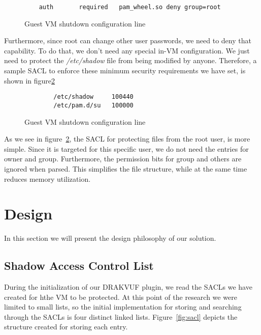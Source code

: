 \begin{figure}[ht]
	\centering
	\begin{lstlisting}
	auth       required   pam_wheel.so deny group=root	
	\end{lstlisting}
	\caption{Guest \ac{VM} shutdown configuration line}
	\label{fig:pam}
\end{figure}

\par Furthermore, since root can change other user passwords, we need to deny that capability. To do that, we don't need any special in-\ac{VM} configuration. We just need to protect the \textit{/etc/shadow} file from being modified by anyone. Therefore, a sample \ac{SACL} to enforce these minimum security requirements we have set, is shown in figure\ref{fig:root_sacl}

\begin{figure}[ht]
	\centering
	\begin{lstlisting}
		/etc/shadow     100440
		/etc/pam.d/su   100000
	\end{lstlisting}
	\caption{Guest \ac{VM} shutdown configuration line}
	\label{fig:root_sacl}
\end{figure}

\par As we see in figure~\ref{fig:root_sacl}, the \ac{SACL} for protecting files from the root user, is more simple. Since it is targeted for this specific user, we do not need the entries for owner and group. Furthermore, the permission bits for group and others are ignored when parsed. This simplifies the file structure, while at the same time reduces memory utilization.



\section{Design}\label{sec:design}
In this section we will present the design philosophy of our solution.

\subsection{Shadow Access Control List}\label{sub:sacl}
During the initialization of our DRAKVUF plugin, we read the \ac{SACL}s we have created for hthe \ac{VM} to be protected. At this point of the research we were limited to small lists, so the initial implementation for storing and searching through the \ac{SACL}s is four distinct linked lists. Figure~\ref{fig:sacl} depicts the structure created for storing each entry.

